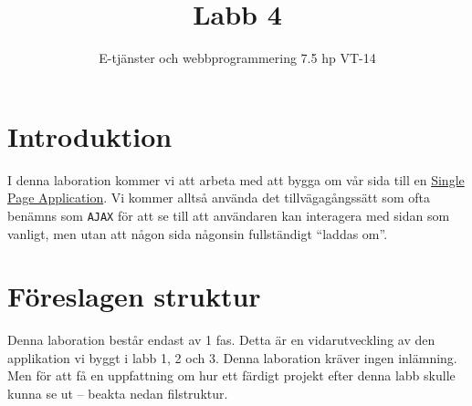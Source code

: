 \documentclass[12pt]{article}
\date{}
\title{ Labb 4 }
\author{ E-tjänster och webbprogrammering 7.5 hp VT-14 }
\begin{document}
\maketitle
\vspace{-2em}



\section{Introduktion}
I denna laboration kommer vi att arbeta med att bygga om vår sida till en \href{http://en.wikipedia.org/wiki/Single-page_application}{Single Page Application}. Vi kommer alltså använda det tillvägagångssätt som ofta benämns som \texttt{AJAX} för att se till att användaren kan interagera med sidan som vanligt, men utan att någon sida någonsin fullständigt ``laddas om''.





\pagebreak
\section{Föreslagen struktur}
Denna laboration består endast av 1 fas. Detta är en vidarutveckling av den applikation vi byggt i labb 1, 2 och 3. Denna laboration kräver ingen inlämning. Men för att få en uppfattning om hur ett färdigt projekt efter denna labb skulle kunna se ut -- beakta nedan filstruktur.
\end{document}
